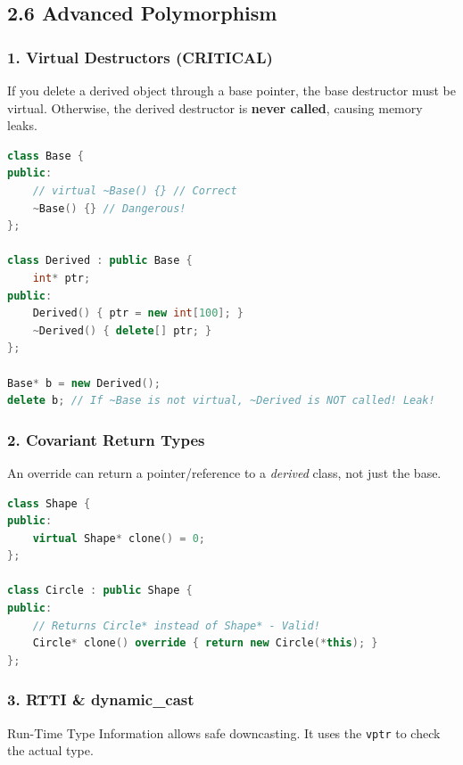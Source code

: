 \hypertarget{advanced-polymorphism}{%
\subsection{2.6 Advanced Polymorphism}\label{advanced-polymorphism}}

\hypertarget{virtual-destructors-critical}{%
\subsubsection{1. Virtual Destructors
(CRITICAL)}\label{virtual-destructors-critical}}

If you delete a derived object through a base pointer, the base
destructor must be virtual. Otherwise, the derived destructor is
\textbf{never called}, causing memory leaks.

\begin{lstlisting}[language={C++}]
class Base {
public:
    // virtual ~Base() {} // Correct
    ~Base() {} // Dangerous!
};

class Derived : public Base {
    int* ptr;
public:
    Derived() { ptr = new int[100]; }
    ~Derived() { delete[] ptr; }
};

Base* b = new Derived();
delete b; // If ~Base is not virtual, ~Derived is NOT called! Leak!
\end{lstlisting}

\hypertarget{covariant-return-types}{%
\subsubsection{2. Covariant Return Types}\label{covariant-return-types}}

An override can return a pointer/reference to a \emph{derived} class,
not just the base.

\begin{lstlisting}[language={C++}]
class Shape {
public:
    virtual Shape* clone() = 0;
};

class Circle : public Shape {
public:
    // Returns Circle* instead of Shape* - Valid!
    Circle* clone() override { return new Circle(*this); }
};
\end{lstlisting}

\hypertarget{rtti-dynamic_cast}{%
\subsubsection{3. RTTI \& dynamic\_cast}\label{rtti-dynamic_cast}}

Run-Time Type Information allows safe downcasting. It uses the
\passthrough{\lstinline!vptr!} to check the actual type.

